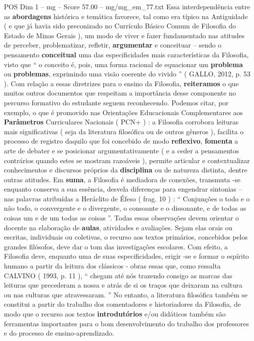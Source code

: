 \begin{textsample}{POS Dim 1 – mg – Score 57.00 – mg/mg\_em\_77.txt}
Essa interdependência entre as \textbf{abordagens} histórica e temática favorece, tal como era típico na Antiguidade ( e que já havia sido preconizado no Currículo Básico Comum de Filosofia do Estado de Minas Gerais ), um modo de viver e fazer fundamentado nas atitudes de perceber, problematizar, refletir, \textbf{argumentar} e conceituar – sendo o pensamento \textbf{conceitual} uma das especificidades mais características da Filosofia, visto que “ o conceito é, pois, uma forma racional de equacionar um \textbf{problema} ou \textbf{problemas}, exprimindo uma visão coerente do vivido ” ( GALLO, 2012, p. 53 ).
Com relação a essas diretrizes para o ensino da Filosofia, \textbf{reiteramos} o que muitos outros documentos que respeitam a importância desse componente no percurso formativo do estudante seguem reconhecendo.
Podemos citar, por exemplo, o que é promovido nas Orientações Educacionais Complementares aos \textbf{Parâmetros} Curriculares Nacionais ( PCN+ ) : a Filosofia corrobora leituras mais significativas ( seja da literatura filosófica ou de outros gêneros ), facilita o processo de registro daquilo que foi concebido de modo \textbf{reflexivo}, \textbf{fomenta} a arte de debater e se posicionar argumentativamente ( e a ceder a pensamentos contrários quando estes se mostram razoáveis ), permite articular e contextualizar conhecimentos e discursos próprios da \textbf{disciplina} ou de natureza distinta, dentre outras atitudes.
Em \textbf{suma}, a Filosofia é mediadora de conexões, transmuta -se enquanto conserva a sua essência, desvela diferenças para engendrar sintonias – nas palavras atribuídas a Heráclito de Éfeso ( frag. 10 ) : “ Conjunções o todo e o não todo, o convergente e o divergente, o consoante e o dissonante, e de todas as coisas um e de um todas as coisas ”.
Todas essas observações devem orientar o docente na elaboração de \textbf{aulas}, atividades e avaliações.
Sejam elas orais ou escritas, individuais ou coletivas, o recurso aos textos primários, concebidos pelos grandes filósofos, deve dar o tom das investigações escolares.
Com efeito, a Filosofia deve, enquanto uma de suas especificidades, erigir -se e formar o espírito humano a partir da leitura dos clássicos - obras essas que, como ressalta CALVINO ( 1993, p. 11 ), “ chegam até nós trazendo consigo as marcas das leituras que precederam a nossa e atrás de si os traços que deixaram na cultura ou nas culturas que atravessaram. ” No entanto, a literatura filosófica também se constitui a partir do trabalho dos comentadores e historiadores da Filosofia, de modo que o recurso aos textos \textbf{introdutórios} e/ou didáticos também são ferramentas importantes para o bom desenvolvimento do trabalho dos professores e do processo de ensino-aprendizado.

\end{textsample}
